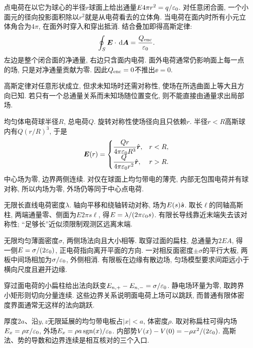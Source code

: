 \label{ch:gauss}
点电荷在以它为球心的半径$r$球面上给出通量$E4\pi r^2=q/\varepsilon_0$. 对任意闭合面, 一个小面元的径向投影面积除以$r^2$就是从电荷看去的立体角. 当电荷在面内时所有小元立体角合为$4\pi$, 在面外时穿入和穿出抵消. 结合叠加即得高斯定律:
\begin{equation}\label{eq:gauss}
\oint_S\boldsymbol{E}\cdot\,\mathrm d\boldsymbol{A}=\frac{Q_{\rm enc}}{\varepsilon_0}.
\end{equation}
左边是整个闭合面的净通量, 右边只含面内电荷. 面外电荷通常仍影响面上每一点的场, 只是对净通量贡献为零. 因此$Q_{\rm enc}=0$不推出$\ee=0$.

高斯定律对任意形状成立, 但求未知场时还需对称性, 使场在所选曲面上等大且方向已知. 若只有一个总通量关系而未知场随位置变化, 则不能直接由通量求出局部场.

均匀体电荷球半径$R$, 总电荷$Q$. 旋转对称性使场径向且只依赖$r$. 半径$r<R$高斯球内有$Q(r/R)^3$, 于是
\[
\boldsymbol{E}(r)=\begin{cases}\displaystyle\frac{Qr}{4\pi\varepsilon_0 R^3}\hat{\boldsymbol{r}},&r<R,\\[3pt]
\displaystyle\frac Q{4\pi\varepsilon_0 r^2}\hat{\boldsymbol{r}},&r>R.\end{cases}
\]
中心场为零, 边界两侧连续. 对仅在球面上均匀带电的薄壳, 内部无包围电荷并有球对称, 所以内场为零, 外场仍等同于中心点电荷.

无限长直线电荷密度$\lambda$. 轴向平移和绕轴转动对称, 场为$E(s)\hat{\boldsymbol{s}}$. 取长$\ell$的同轴高斯柱, 两端通量零、侧面为$E2\pi s\ell$, 得$E=\lambda/(2\pi\varepsilon_0 s)$. 有限长导线靠近末端失去该对称性; “足够长”近似须限制观测区远离末端.

无限均匀薄面密度$\sigma$, 两侧场法向且大小相等. 取穿过面的扁柱, 总通量为$2EA$, 得一侧$E=\sigma/(2\varepsilon_0)$, 正电荷指向离开平面的方向. 一对相反面密度$\pm\sigma$的平行大板, 两板中间场相加为$\sigma/\varepsilon_0$, 外侧相消. 有限板在边缘有散边场, 匀场模型要求间距远小于横向尺度且避开边缘.

穿过面电荷的小扁柱给出法向跃变$E_{n,+}-E_{n,-}=\sigma/\varepsilon_0$. 静电场环量为零, 取跨界小矩形则切向分量连续. 这些边界关系说明面电荷上场可以跳跃, 而普通有限体密度界面通常无这样的法向跳跃.

厚度$2a$、沿$y,z$无限延展的均匀带电板占$|x|<a$, 体密度$\rho$. 取对称扁柱可得内场$E_x=\rho x/\varepsilon_0$, 外场$E_x=\rho a\operatorname{sgn}(x)/\varepsilon_0$. 内部势$V(x)-V(0)=-\rho x^2/(2\varepsilon_0)$. 高斯法、势的导数和边界连续是相互核对的三个入口.
